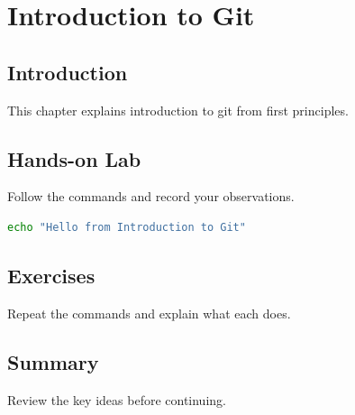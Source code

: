 \chapter{Introduction to Git}
\label{vol2chap5}



\section{Introduction}
This chapter explains introduction to git from first principles.

\section{Hands-on Lab}
Follow the commands and record your observations.

\begin{lstlisting}[language=bash]
echo "Hello from Introduction to Git"
\end{lstlisting}

\section{Exercises}
\begin{exercise}
Repeat the commands and explain what each does.
\end{exercise}

\section{Summary}
Review the key ideas before continuing.

